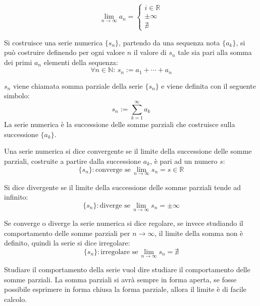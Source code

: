\documentclass{article}
\numberwithin{equation}{subsection}
\begin{document}
\begin{equation}
    \lim_{n\to\infty}a_n=\begin{cases}
        i\in\mathbb{R}\\
        \pm\infty\\
        \nexists
    \end{cases}
\end{equation}

Si costruisce una serie numerica $\{s_n\}$, partendo da una sequenza nota $\{a_k\}$, si può costruire definendo per ogni valore $n$ il valore di $s_n$ tale sia pari alla somma dei primi $a_n$ elementi della sequenza:
\begin{equation}
    \forall n\in\mathbb{N}:\,
    s_n:=a_1+\cdots+a_n
\end{equation}

$s_n$ viene chiamata somma parziale della serie $\{s_n\}$ e viene definita con il seguente simbolo:
\begin{equation}
    s_n:=\displaystyle\sum_{k=1}^\infty a_k
\end{equation}
La serie numerica è la successione delle somme parziali che costruisce sulla successione $\{a_k\}$. 

Una serie numerica si dice convergente se il limite della successione delle somme parziali, costruite a partire dalla successione $a_k$, è pari ad un numero $s$:
\begin{equation}
    \{s_n\}: \mbox{converge se}\,\lim_{n\to\infty}s_n=s\in\mathbb{R}
\end{equation}

Si dice divergente se il limite della successione delle somme parziali tende ad infinito:
\begin{equation}
    \{s_n\}: \mbox{diverge se}\,\lim_{n\to\infty}s_n=\pm\infty
\end{equation}

Se converge o diverge la serie numerica si dice regolare, se invece studiando il comportamento delle somme parziali per $n\to\infty$, il limite della somma non è definito, quindi la serie si dice irregolare:
\begin{equation}
    \{s_n\}: \mbox{irregolare se}\,\lim_{n\to\infty}s_n=\nexists
\end{equation}

Studiare il comportamento della serie vuol dire studiare il comportamento delle somme parziali. La somma parziali si avrà sempre in forma aperta, se fosse possibile esprimere in forma chiusa la forma parziale, allora il limite è di facile calcolo. 
\end{document}
